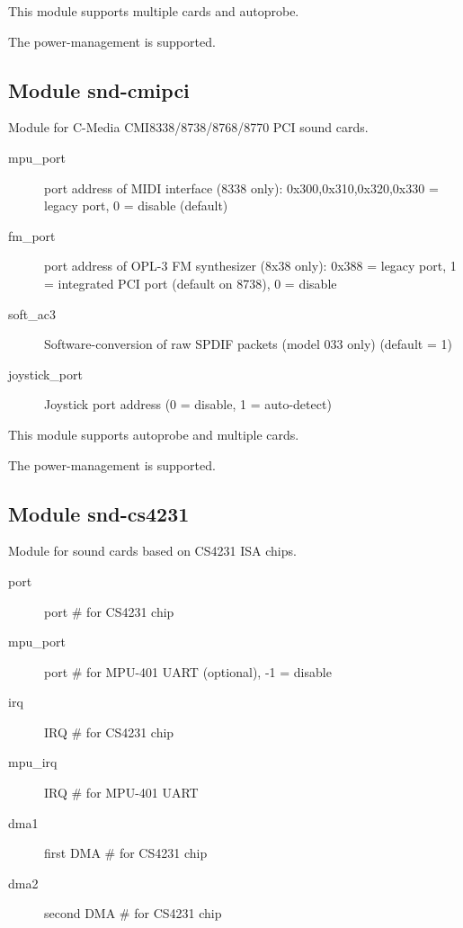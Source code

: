 \documentclass[a4paper,8pt,english]{sphinxmanual}
\begin{document}
This module supports multiple cards and autoprobe.

The power-management is supported.


\subsection{Module snd-cmipci}
\label{sound/alsa-configuration:module-snd-cmipci}
Module for C-Media CMI8338/8738/8768/8770 PCI sound cards.
\begin{description}
\item[{mpu\_port}] \leavevmode
port address of MIDI interface (8338 only):
0x300,0x310,0x320,0x330 = legacy port,
0 = disable (default)

\item[{fm\_port}] \leavevmode
port address of OPL-3 FM synthesizer (8x38 only):
0x388 = legacy port,
1 = integrated PCI port (default on 8738),
0 = disable

\item[{soft\_ac3}] \leavevmode
Software-conversion of raw SPDIF packets (model 033 only) (default = 1)

\item[{joystick\_port}] \leavevmode
Joystick port address (0 = disable, 1 = auto-detect)

\end{description}

This module supports autoprobe and multiple cards.

The power-management is supported.


\subsection{Module snd-cs4231}
\label{sound/alsa-configuration:module-snd-cs4231}
Module for sound cards based on CS4231 ISA chips.
\begin{description}
\item[{port}] \leavevmode
port \# for CS4231 chip

\item[{mpu\_port}] \leavevmode
port \# for MPU-401 UART (optional), -1 = disable

\item[{irq}] \leavevmode
IRQ \# for CS4231 chip

\item[{mpu\_irq}] \leavevmode
IRQ \# for MPU-401 UART

\item[{dma1}] \leavevmode
first DMA \# for CS4231 chip

\item[{dma2}] \leavevmode
second DMA \# for CS4231 chip

\end{description}
\end{document}
